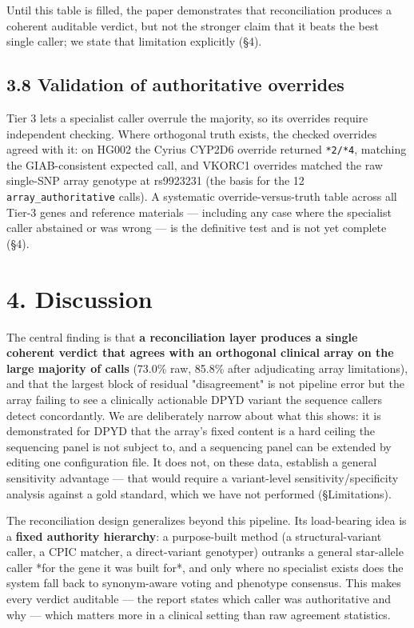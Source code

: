 \documentclass[11pt]{article}
\begin{document}
Until this table is filled, the paper demonstrates that reconciliation produces a coherent auditable verdict, but not the stronger claim that it beats the best single caller; we state that limitation explicitly (§4).

\subsection*{3.8 Validation of authoritative overrides}

Tier 3 lets a specialist caller overrule the majority, so its overrides require independent checking. Where orthogonal truth exists, the checked overrides agreed with it: on HG002 the Cyrius CYP2D6 override returned \texttt{*2/*4}, matching the GIAB-consistent expected call, and VKORC1 overrides matched the raw single-SNP array genotype at rs9923231 (the basis for the 12 \texttt{array\_authoritative} calls). A systematic override-versus-truth table across all Tier-3 genes and reference materials --- including any case where the specialist caller abstained or was wrong --- is the definitive test and is not yet complete (§4).

\section*{4. Discussion}

The central finding is that \textbf{a reconciliation layer produces a single coherent verdict that agrees with an orthogonal clinical array on the large majority of calls} (73.0\% raw, 85.8\% after adjudicating array limitations), and that the largest block of residual "disagreement" is not pipeline error but the array failing to see a clinically actionable DPYD variant the sequence callers detect concordantly. We are deliberately narrow about what this shows: it is demonstrated for DPYD that the array's fixed content is a hard ceiling the sequencing panel is not subject to, and a sequencing panel can be extended by editing one configuration file. It does not, on these data, establish a general sensitivity advantage --- that would require a variant-level sensitivity/specificity analysis against a gold standard, which we have not performed (§Limitations).

The reconciliation design generalizes beyond this pipeline. Its load-bearing idea is a \textbf{fixed authority hierarchy}: a purpose-built method (a structural-variant caller, a CPIC matcher, a direct-variant genotyper) outranks a general star-allele caller *for the gene it was built for*, and only where no specialist exists does the system fall back to synonym-aware voting and phenotype consensus. This makes every verdict auditable --- the report states which caller was authoritative and why --- which matters more in a clinical setting than raw agreement statistics.
\end{document}
